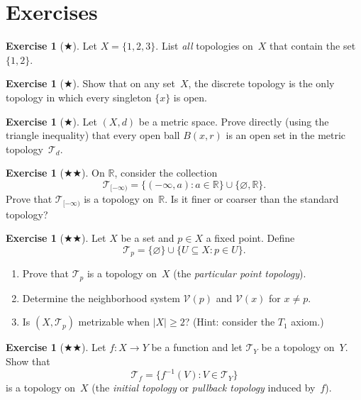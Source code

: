 \documentclass[11pt,a4paper,twoside]{book}
\theoremstyle{remark}
\theoremstyle{definition}
\newtheorem{exerciseplain}[theorem]{Exercise}
\theoremstyle{definition}
\newenvironment{exercise}[1][]{%
  \begin{exerciseplain}[#1]
}{%
  \end{exerciseplain}
}
\newcommand{\Tau}{\mathcal{T}}           %
\newcommand{\Nbhd}{\mathcal{V}}          %
\newcommand{\R}{\mathbb{R}}
\begin{document}
\section{Exercises}
\label{sec:exercises-ch1}

\begin{exercise}[$\bigstar$]
\label{exer:ch1:1}
Let $X=\{1,2,3\}$.  List \emph{all} topologies on~$X$ that contain the set
$\{1,2\}$.
\end{exercise}

\begin{exercise}[$\bigstar$]
\label{exer:ch1:2}
Show that on any set~$X$, the discrete topology is the only topology in which
every singleton $\{x\}$ is open.
\end{exercise}

\begin{exercise}[$\bigstar$]
\label{exer:ch1:3}
Let $(X,d)$ be a metric space.  Prove directly (using the triangle inequality)
that every open ball $B(x,r)$ is an open set in the metric topology~$\Tau_d$.
\end{exercise}

\begin{exercise}[$\bigstar\!\bigstar$]
\label{exer:ch1:4}
On $\R$, consider the collection
\[
  \Tau_{[-\infty)} = \{(-\infty,a) : a\in\R\}\cup\{\varnothing,\R\}.
\]
Prove that $\Tau_{[-\infty)}$ is a topology on~$\R$.  Is it finer or coarser
than the standard topology?
\end{exercise}

\begin{exercise}[$\bigstar\!\bigstar$]
\label{exer:ch1:5}
Let $X$ be a set and $p\in X$ a fixed point.  Define
\[
  \Tau_p = \{\varnothing\}\cup\{U\subseteq X : p\in U\}.
\]
\begin{enumerate}[label=(\alph*)]
  \item Prove that $\Tau_p$ is a topology on~$X$ (the \emph{particular point
        topology}).
  \item Determine the neighborhood system $\Nbhd(p)$ and $\Nbhd(x)$ for
        $x\neq p$.
  \item Is $(X,\Tau_p)$ metrizable when $|X|\geq 2$?  (Hint: consider the $T_1$
        axiom.)
\end{enumerate}
\end{exercise}

\begin{exercise}[$\bigstar\!\bigstar$]
\label{exer:ch1:6}
Let $f\colon X\to Y$ be a function and let $\Tau_Y$ be a topology on~$Y$.
Show that
\[
  \Tau_f = \{f^{-1}(V) : V\in\Tau_Y\}
\]
is a topology on~$X$ (the \emph{initial topology} or \emph{pullback topology}
induced by~$f$).
\end{exercise}
\end{document}
